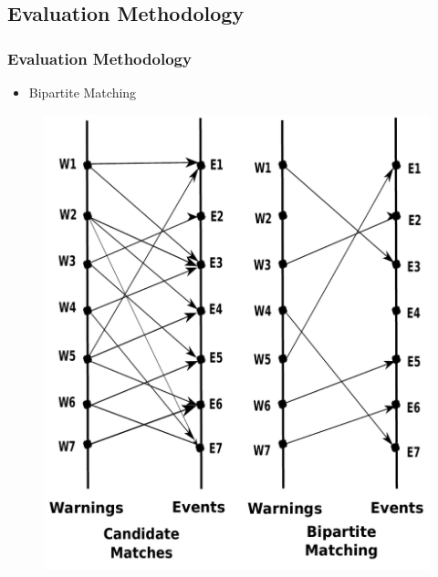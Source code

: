 \documentclass[red]{beamer}
\begin{document}
\subsection{Evaluation Methodology}
\begin{frame}
\frametitle{Evaluation Methodology}
    \begin{itemize}
        \item
            Bipartite Matching
    \end{itemize}
    \begin{figure}
        \includegraphics[height=0.7\textheight]{matching}
    \end{figure}

\end{frame}
\end{document}
